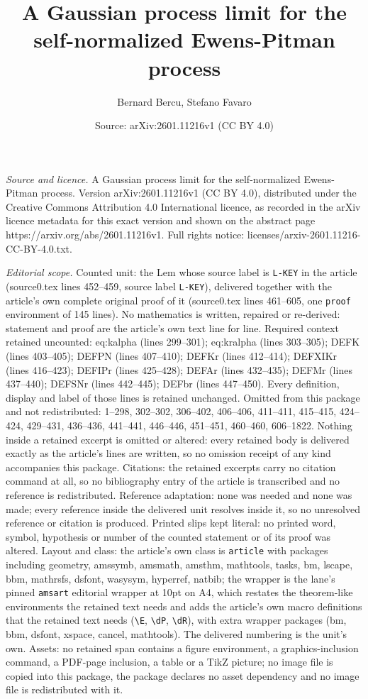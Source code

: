 \documentclass[10pt,a4paper]{amsart}
\title[A Gaussian process limit for the self-normalized Ewens-Pitma]{A Gaussian process limit for the self-normalized Ewens-Pitman process}
\author{Bernard Bercu, Stefano Favaro}
\date{Source: arXiv:2601.11216v1 (CC BY 4.0)}
\begin{document}
\maketitle

\noindent\emph{Source and licence.} A Gaussian process limit for the self-normalized Ewens-Pitman process. Version arXiv:2601.11216v1 (CC BY 4.0), distributed under the Creative Commons Attribution 4.0 International licence, as recorded in the arXiv licence metadata for this exact version and shown on the abstract page https://arxiv.org/abs/2601.11216v1. Full rights notice: licenses/arxiv-2601.11216-CC-BY-4.0.txt.\par\smallskip

\noindent\textit{Editorial scope.} Counted unit: the Lem whose source label is \texttt{L-KEY} in the article (source0.tex lines 452--459, source label \texttt{L-KEY}), delivered together with the article's own complete original proof of it (source0.tex lines 461--605, one \texttt{proof} environment of 145 lines). No mathematics is written, repaired or re-derived: statement and proof are the article's own text line for line. Required context retained uncounted: eq:kalpha (lines 299--301); eq:kralpha (lines 303--305); DEFK (lines 403--405); DEFPN (lines 407--410); DEFKr (lines 412--414); DEFXIKr (lines 416--423); DEFIPr (lines 425--428); DEFAr (lines 432--435); DEFMr (lines 437--440); DEFSNr (lines 442--445); DEFbr (lines 447--450). Every definition, display and label of those lines is retained unchanged. Omitted from this package and not redistributed: 1--298, 302--302, 306--402, 406--406, 411--411, 415--415, 424--424, 429--431, 436--436, 441--441, 446--446, 451--451, 460--460, 606--1822. Nothing inside a retained excerpt is omitted or altered: every retained body is delivered exactly as the article's lines are written, so no omission receipt of any kind accompanies this package. Citations: the retained excerpts carry no citation command at all, so no bibliography entry of the article is transcribed and no reference is redistributed. Reference adaptation: none was needed and none was made; every reference inside the delivered unit resolves inside it, so no unresolved reference or citation is produced. Printed slips kept literal: no printed word, symbol, hypothesis or number of the counted statement or of its proof was altered. Layout and class: the article's own class is \texttt{article} with packages including geometry, amssymb, amsmath, amsthm, mathtools, tasks, bm, lscape, bbm, mathrsfs, dsfont, wasysym, hyperref, natbib; the wrapper is the lane's pinned \texttt{amsart} editorial wrapper at 10pt on A4, which restates the theorem-like environments the retained text needs and adds the article's own macro definitions that the retained text needs (\texttt{\textbackslash E}, \texttt{\textbackslash dP}, \texttt{\textbackslash dR}), with extra wrapper packages (bm, bbm, dsfont, xspace, cancel, mathtools). The delivered numbering is the unit's own. Assets: no retained span contains a figure environment, a graphics-inclusion command, a PDF-page inclusion, a table or a TikZ picture; no image file is copied into this package, the package declares no asset dependency and no image file is redistributed with it. 
\end{document}
